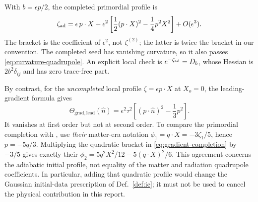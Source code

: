\documentclass[11pt]{article}
\theoremstyle{definition}
\theoremstyle{remark}
\newcommand{\eps}{\epsilon}
\newcommand{\nh}{\hat n}
\begin{document}
With $b=\eps p/2$, the completed primordial profile is
\begin{equation}\label{eq:gradient-completion}
\zeta_{\rm ad}=\eps\,p\cdot X
+\eps^2\left[\frac12(p\cdot X)^2-\frac14p^2X^2\right]+O(\eps^3).
\end{equation}
The bracket is the coefficient of $\eps^2$, not $\zeta^{(2)}$; the latter is twice the
bracket in our convention. The completed seed has vanishing curvature, so it also passes
\eqref{eq:curvature-quadrupole}. An explicit local check is
$e^{-\zeta_{\rm ad}}=D_b$, whose Hessian is $2b^2\delta_{ij}$ and has zero trace-free part.

By contrast, for the \emph{uncompleted} local profile $\zeta=\eps p\cdot X$ at $X_o=0$,
the leading-gradient formula gives
\begin{equation}\label{eq:physical-gradient-quadrupole}
\Theta_{\mathrm{grad,lead}}(\nh)
=\eps^2\tau^2\left[(p\cdot\nh)^2-\frac13p^2\right].
\end{equation}
It vanishes at first order but not at second order. To compare the primordial completion
with \cite{MirbabayiZaldarriaga}, use \emph{their} matter-era notation
$\phi_1=q\cdot X=-3\zeta_1/5$, hence $p=-5q/3$. Multiplying the quadratic bracket in
\eqref{eq:gradient-completion} by $-3/5$ gives exactly their
$\phi_2=5q^2X^2/12-5(q\cdot X)^2/6$. This agreement concerns the adiabatic initial profile,
not equality of the matter and radiation quadrupole coefficients. In particular, adding
that quadratic profile would change the Gaussian initial-data prescription of
Def.~\ref{def:ic}; it must not be used to cancel the physical contribution in this report.
\end{document}
